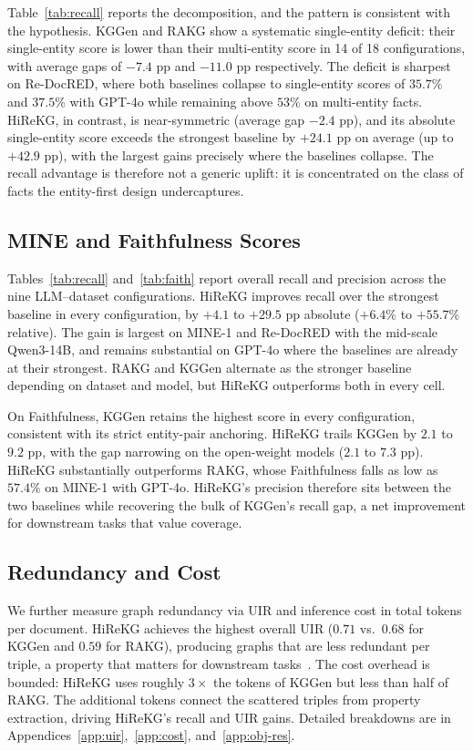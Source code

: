 \documentclass[11pt]{article}
\begin{document}
Table~\ref{tab:recall} reports the decomposition, and the pattern is consistent with the hypothesis. KGGen and RAKG show a systematic single-entity deficit: their single-entity score is lower than their multi-entity score in 14 of 18 configurations, with average gaps of $-7.4$ pp and $-11.0$ pp respectively. The deficit is sharpest on Re-DocRED, where both baselines collapse to single-entity scores of $35.7\%$ and $37.5\%$ with GPT-4o while remaining above $53\%$ on multi-entity facts. HiReKG, in contrast, is near-symmetric (average gap $-2.4$ pp), and its absolute single-entity score exceeds the strongest baseline by $+24.1$ pp on average (up to $+42.9$ pp), with the largest gains precisely where the baselines collapse. The recall advantage is therefore not a generic uplift: it is concentrated on the class of facts the entity-first design undercaptures.



\subsection{MINE and Faithfulness Scores}
\label{sec:main-results}
Tables~\ref{tab:recall} and~\ref{tab:faith} report overall recall and precision across the nine LLM--dataset configurations. HiReKG improves recall over the strongest baseline in every configuration, by $+4.1$ to $+29.5$ pp absolute ($+6.4\%$ to $+55.7\%$ relative). The gain is largest on MINE-1 and Re-DocRED with the mid-scale Qwen3-14B, and remains substantial on GPT-4o where the baselines are already at their strongest. RAKG and KGGen alternate as the stronger baseline depending on dataset and model, but HiReKG outperforms both in every cell.

On Faithfulness, KGGen retains the highest score in every configuration, consistent with its strict entity-pair anchoring. HiReKG trails KGGen by $2.1$ to $9.2$ pp, with the gap narrowing on the open-weight models ($2.1$ to $7.3$ pp). HiReKG substantially outperforms RAKG, whose Faithfulness falls as low as $57.4\%$ on MINE-1 with GPT-4o. HiReKG's precision therefore sits between the two baselines while recovering the bulk of KGGen's recall gap, a net improvement for downstream tasks that value coverage.



\subsection{Redundancy and Cost}
\label{sec:cost-redundancy}
We further measure graph redundancy via UIR and inference cost in total tokens per document. HiReKG achieves the highest overall UIR ($0.71$ vs.\ $0.68$ for KGGen and $0.59$ for RAKG), producing graphs that are less redundant per triple, a property that matters for downstream tasks~\citep{redundanyinkg}. The cost overhead is bounded: HiReKG uses roughly $3\times$ the tokens of KGGen but less than half of RAKG. The additional tokens connect the scattered triples from property extraction, driving HiReKG's recall and UIR gains. Detailed breakdowns are in Appendices~\ref{app:uir},~\ref{app:cost}, and~\ref{app:obj-res}.
\end{document}
